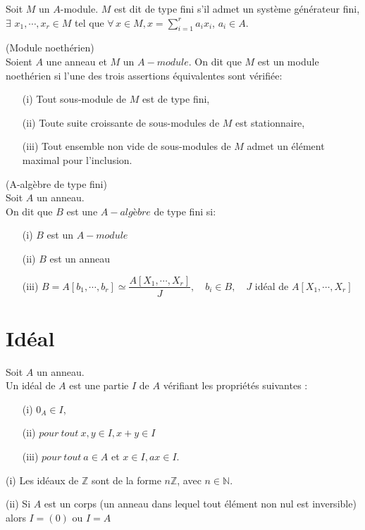 \begin{madefinition}
	Soit $M$ un $A$-module. $M$ est dit de type fini s'il admet un système générateur fini, $\exists \, \, x_1, \cdots ,x_r \in M$ tel que $\forall \,  x \in M, x = \displaystyle \sum_{i=1}^{r}{a_i x_i}$, $a_i \in A$.
\end{madefinition}
\begin{maproposition}
	(Module noethérien)\\
	Soient $A$ une anneau et $M$ un $A-module$. On dit que $M$ est un module noethérien si l'une des trois assertions équivalentes sont vérifiée:
	\begin{enumerate}
		\item[(i)] Tout sous-module de $M$ est de type fini,
		\item[(ii)] Toute suite croissante de sous-modules de $M$ est stationnaire,
		\item[(iii)] Tout ensemble non vide de sous-modules de $M$ admet un élément maximal pour l'inclusion.
	\end{enumerate} 
\end{maproposition}
\begin{madefinition}(A-algèbre de type fini)\\
	Soit $A$ un anneau. \\
	On dit que $B$ est une $A-algèbre$ de type fini si:
	\begin{enumerate}
		\item[(i)] $B$ est un $A-module$
		\item[(ii)] $B$ est un anneau
		\item[(iii)] $B = A [b_1, \cdots, b_r] \simeq \dfrac{A[X_1, \cdots, X_r]}{J}, \quad b_i \in B , \quad J$ idéal de $A[X_1, \cdots, X_r]$
	\end{enumerate}
\end{madefinition}
\section{Idéal}
\begin{madefinition}
	Soit $A$ un anneau.\\
	Un idéal de $A$ est une partie $I$ de $A$ vérifiant les propriétés suivantes : \\
	\begin{enumerate}
		\item[(i)] $0_A \in I$,
		\item[(ii)]$ pour \ tout \ x, y \in I, x+y \in I$
		\item[(iii)]$pour \ tout \ a \in A$ et $x \in I , ax \in I$.
	\end{enumerate}
\end{madefinition}
\begin{monexemple}
	\item[(i)] Les idéaux de $\mathbb{Z}$ sont de la forme $n\mathbb{Z}$, avec $n \in \mathbb{N}$.
	\item[(ii)] Si $A$ est un corps (un anneau dans lequel tout élément non nul est inversible) alors $I=(0)$ ou $I=A$
\end{monexemple}
